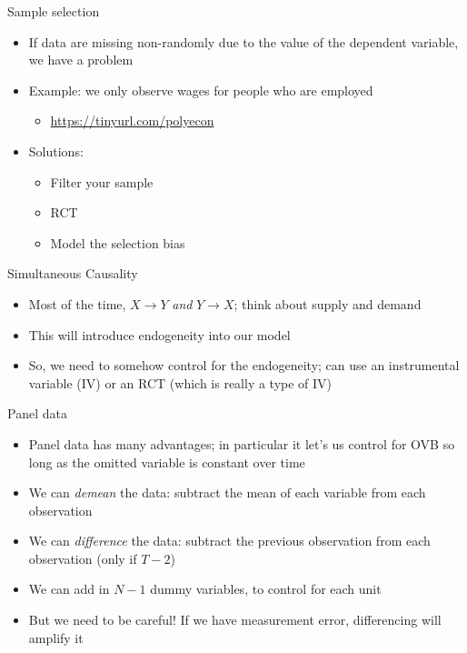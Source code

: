 \documentclass[aspectratio=169]{beamer}
\begin{document}
\begin{frame}{Sample selection}
    \begin{itemize}
        \item If data are missing non-randomly due to the value of the dependent variable, we have a problem
        \item Example: we only observe wages for people who are employed
        \begin{itemize}
            \item \href{notebook}{https://tinyurl.com/polyecon}
        \end{itemize}
        \item Solutions:
        \begin{itemize}
            \item Filter your sample
            \item RCT
            \item Model the selection bias
        \end{itemize}
    \end{itemize}
\end{frame}

\begin{frame}{Simultaneous Causality}
    \begin{itemize}
        \item Most of the time, $X \to Y$ \textit{and} $Y \to X$; think about supply and demand 
        \item This will introduce endogeneity into our model
        \item So, we need to somehow control for the endogeneity; can use an instrumental variable (IV) or an RCT (which is really a type of IV)
    \end{itemize}
\end{frame}

\begin{frame}{Panel data}
    \begin{itemize}
        \item Panel data has many advantages; in particular it let's us control for OVB so long as the omitted variable is constant over time
        \item We can \textit{demean} the data: subtract the mean of each variable from each observation
        \item We can \textit{difference} the data: subtract the previous observation from each observation (only if $T-2$)
        \item We can add in $N-1$ dummy variables, to control for each unit
        \item But we need to be careful! If we have measurement error, differencing will amplify it
    \end{itemize}
\end{frame}
\end{document}
